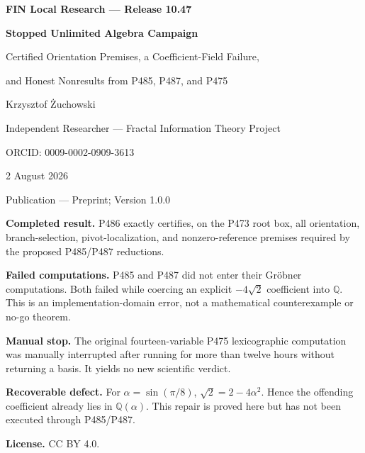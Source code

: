 \documentclass[11pt,a4paper,openany]{report}
\newcommand{\Q}{\mathbb Q}
\begin{document}
\hypersetup{pageanchor=false}
\begin{titlepage}\centering\vspace*{8mm}
{\Large\bfseries FIN Local Research --- Release 10.47\par}\vspace{10mm}
{\Huge\bfseries Stopped Unlimited Algebra Campaign\par}\vspace{6mm}
{\Large Certified Orientation Premises, a Coefficient-Field Failure,\par}
{\Large and Honest Nonresults from P485, P487, and P475\par}\vspace{14mm}
{\Large Krzysztof \.Zuchowski\par}\vspace{2mm}
{\normalsize Independent Researcher --- Fractal Information Theory Project\par}
{\normalsize ORCID: 0009-0002-0909-3613\par}\vspace{8mm}
{\large 2 August 2026\par}
{\normalsize Publication --- Preprint; Version 1.0.0\par}
\vfill
\begin{minipage}{0.92\textwidth}\small
\textbf{Completed result.} P486 exactly certifies, on the P473 root box, all
orientation, branch-selection, pivot-localization, and nonzero-reference
premises required by the proposed P485/P487 reductions.

\medskip\textbf{Failed computations.} P485 and P487 did not enter their
Gröbner computations. Both failed while coercing an explicit
\( -4\sqrt2\) coefficient into \(\Q\). This is an implementation-domain
error, not a mathematical counterexample or no-go theorem.

\medskip\textbf{Manual stop.} The original fourteen-variable P475
lexicographic computation was manually interrupted after running for more
than twelve hours without returning a basis. It yields no new scientific
verdict.

\medskip\textbf{Recoverable defect.} For
\(\alpha=\sin(\pi/8)\), \(\sqrt2=2-4\alpha^2\). Hence the offending
coefficient already lies in \(\Q(\alpha)\). This repair is proved here but
has not been executed through P485/P487.

\medskip\textbf{License.} CC BY 4.0.
\end{minipage}\vfill
\end{titlepage}
\hypersetup{pageanchor=true}
\end{document}
